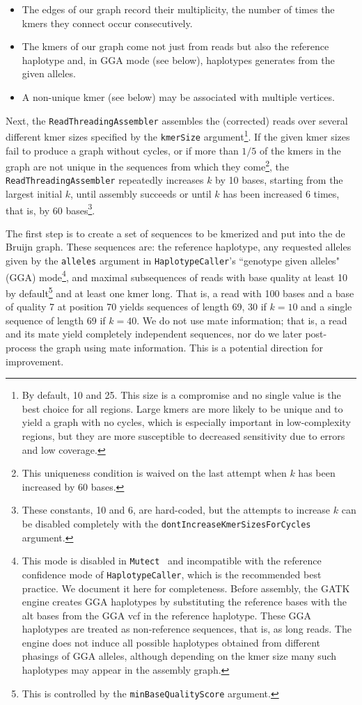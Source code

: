 \documentclass[nofootinbib,amssymb,amsmath]{revtex4}
\newcommand{\HC}{\texttt{HaplotypeCaller}}
\newcommand{\Mutect}{\texttt{Mutect}}
\newcommand{\code}[1]{\texttt{#1}}
\begin{document}
\begin{itemize}
\item The edges of our graph record their multiplicity, the number of times the kmers they connect occur consecutively.
\item The kmers of our graph come not just from reads but also the reference haplotype and, in GGA mode (see below), haplotypes generates from the given alleles.
\item A non-unique kmer (see below) may be associated with multiple vertices.
\end{itemize}

Next, the \code{ReadThreadingAssembler} assembles the (corrected) reads over several different kmer sizes specified by the \code{kmerSize} argument\footnote{By default, 10 and 25.  This size is a compromise and no single value is the best choice for all regions.  Large kmers are more likely to be unique and to yield a graph with no cycles, which is especially important in low-complexity regions, but they are more susceptible to decreased sensitivity due to errors and low coverage.}.  If the given kmer sizes fail to produce a graph without cycles, or if more than $1/5$ of the kmers in the graph are not unique in the sequences from which they come\footnote{This uniqueness condition is waived on the last attempt when $k$ has been increased by 60 bases.}, the \code{ReadThreadingAssembler} repeatedly increases $k$ by 10 bases, starting from the largest initial $k$, until assembly succeeds or until $k$ has been increased 6 times, that is, by 60 bases\footnote{These constants, 10 and 6, are hard-coded, but the attempts to increase $k$ can be disabled completely with the \code{dontIncreaseKmerSizesForCycles} argument.}.

The first step is to create a set of sequences to be kmerized and put into the de Bruijn graph.  These sequences are: the reference haplotype, any requested alleles given by the \code{alleles} argument in \HC's ``genotype given alleles" (GGA) mode\footnote{This mode is disabled in \Mutect~ and incompatible with the reference confidence mode of \HC, which is the recommended best practice.  We document it here for completeness.  Before assembly, the GATK engine creates GGA haplotypes by substituting the reference bases with the alt bases from the GGA vcf in the reference haplotype.  These GGA haplotypes are treated as non-reference sequences, that is, as long reads.  The engine does not induce all possible haplotypes obtained from different phasings of GGA alleles, although depending on the kmer size many such haplotypes may appear in the assembly graph.}, and maximal subsequences of reads with base quality at least 10 by default\footnote{This is controlled by the \code{minBaseQualityScore} argument.} and at least one kmer long.  That is, a read with 100 bases and a base of quality 7 at position 70 yields sequences of length 69, 30 if $k = 10$ and a single sequence of length 69 if $k = 40$.  We do not use mate information; that is, a read and its mate yield completely independent sequences, nor do we later post-process the graph using mate information.  This is a potential direction for improvement.
\end{document}
